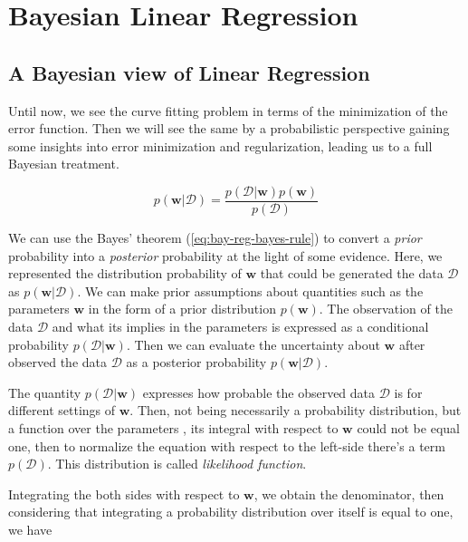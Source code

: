 \documentclass[11pt]{article} %
\begin{document}
\section{Bayesian Linear Regression}

\subsection{A Bayesian view of Linear Regression}

Until now, we see the curve fitting problem in terms of the minimization of the error function. Then we will see the same by a probabilistic perspective gaining some insights into error minimization and regularization, leading us to a full Bayesian treatment.

\begin{equation}
   \label{eq:bay-reg-bayes-rule}
   p(\mathbf{w} | \mathcal{D})=\frac{p(\mathcal{D} | \mathbf{w}) p(\mathbf{w})}{p(\mathcal{D})}
\end{equation}

We can use the Bayes' theorem (\ref{eq:bay-reg-bayes-rule}) to convert a \textit{prior} probability into a \textit{posterior} probability at the light of some evidence. Here, we represented the distribution probability of $\mathbf{w}$ that could be generated the data $\mathcal{D}$ as $p(\mathbf{w}|\mathcal{D})$. We can make prior assumptions about quantities such as the parameters $\mathbf{w}$ in the form of a prior distribution $p(\mathbf{w})$. The observation of the data $\mathcal{D}$ and what its implies in the parameters is expressed as a conditional probability $p(\mathcal{D}|\mathbf{w})$. Then we can evaluate the uncertainty about $\mathbf{w}$ after observed the data $\mathcal{D}$ as a posterior probability $p(\mathbf{w}|\mathcal{D})$.

The quantity $p(\mathcal{D}|\mathbf{w})$ expresses how probable the observed data $\mathcal{D}$ is for different settings of $\mathbf{w}$. Then, not being necessarily a probability distribution, but a function over the parameters \cite{degroot2012probability}, its integral with respect to $\mathbf{w}$ could not be equal one, then to normalize the equation with respect to the left-side there's a term $p(\mathcal{D})$. This distribution is called \textit{likelihood function}.

Integrating the both sides with respect to $\mathbf{w}$, we obtain the denominator, then considering that integrating a probability distribution over itself is equal to one, we have
\end{document}
